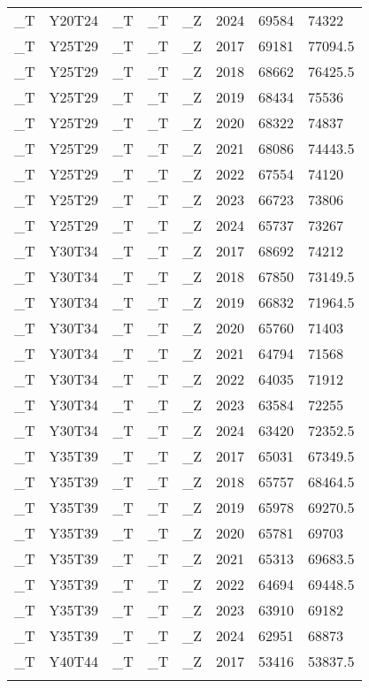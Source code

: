 \begin{longtable}[t]{llllllll}
\_T & Y20T24 & \_T & \_T & \_Z & 2024 & 69584 & 74322\\
\addlinespace
\_T & Y25T29 & \_T & \_T & \_Z & 2017 & 69181 & 77094.5\\
\_T & Y25T29 & \_T & \_T & \_Z & 2018 & 68662 & 76425.5\\
\_T & Y25T29 & \_T & \_T & \_Z & 2019 & 68434 & 75536\\
\_T & Y25T29 & \_T & \_T & \_Z & 2020 & 68322 & 74837\\
\_T & Y25T29 & \_T & \_T & \_Z & 2021 & 68086 & 74443.5\\
\addlinespace
\_T & Y25T29 & \_T & \_T & \_Z & 2022 & 67554 & 74120\\
\_T & Y25T29 & \_T & \_T & \_Z & 2023 & 66723 & 73806\\
\_T & Y25T29 & \_T & \_T & \_Z & 2024 & 65737 & 73267\\
\_T & Y30T34 & \_T & \_T & \_Z & 2017 & 68692 & 74212\\
\_T & Y30T34 & \_T & \_T & \_Z & 2018 & 67850 & 73149.5\\
\addlinespace
\_T & Y30T34 & \_T & \_T & \_Z & 2019 & 66832 & 71964.5\\
\_T & Y30T34 & \_T & \_T & \_Z & 2020 & 65760 & 71403\\
\_T & Y30T34 & \_T & \_T & \_Z & 2021 & 64794 & 71568\\
\_T & Y30T34 & \_T & \_T & \_Z & 2022 & 64035 & 71912\\
\_T & Y30T34 & \_T & \_T & \_Z & 2023 & 63584 & 72255\\
\addlinespace
\_T & Y30T34 & \_T & \_T & \_Z & 2024 & 63420 & 72352.5\\
\_T & Y35T39 & \_T & \_T & \_Z & 2017 & 65031 & 67349.5\\
\_T & Y35T39 & \_T & \_T & \_Z & 2018 & 65757 & 68464.5\\
\_T & Y35T39 & \_T & \_T & \_Z & 2019 & 65978 & 69270.5\\
\_T & Y35T39 & \_T & \_T & \_Z & 2020 & 65781 & 69703\\
\addlinespace
\_T & Y35T39 & \_T & \_T & \_Z & 2021 & 65313 & 69683.5\\
\_T & Y35T39 & \_T & \_T & \_Z & 2022 & 64694 & 69448.5\\
\_T & Y35T39 & \_T & \_T & \_Z & 2023 & 63910 & 69182\\
\_T & Y35T39 & \_T & \_T & \_Z & 2024 & 62951 & 68873\\
\_T & Y40T44 & \_T & \_T & \_Z & 2017 & 53416 & 53837.5\\
\addlinespace

\end{longtable}
